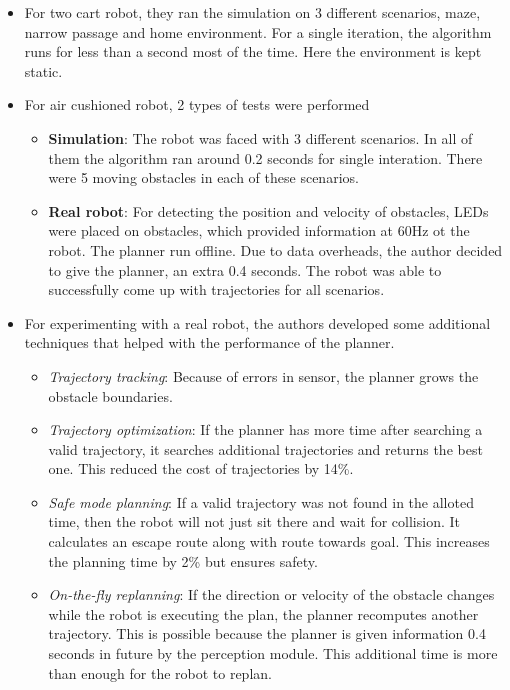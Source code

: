 \documentclass[12pt]{article}
\begin{document}
\begin{itemize}
    \item For two cart robot, they ran the simulation on 3 different scenarios, maze, narrow passage and home environment. For a single iteration, the algorithm runs for less than a second most of the time. Here the environment is kept static.
    \item For air cushioned robot, 2 types of tests were performed
        \begin{itemize}
            \item \textbf{Simulation}: The robot was faced with 3 different scenarios. In all of them the algorithm ran around 0.2 seconds for single interation. There were 5 moving obstacles in each of these scenarios.
            \item \textbf{Real robot}: For detecting the position and velocity of obstacles, LEDs were placed on obstacles, which provided information at 60Hz ot the robot. The planner run offline. Due to data overheads, the author decided to give the planner, an extra 0.4 seconds. The robot was able to successfully come up with trajectories for all scenarios.
        \end{itemize}
    \item For experimenting with a real robot, the authors developed some additional techniques that helped with the performance of the planner.
        \begin{itemize}
            \item \textit{Trajectory tracking}: Because of errors in sensor, the planner grows the obstacle boundaries.
            \item \textit{Trajectory optimization}: If the planner has more time after searching a valid trajectory, it searches additional trajectories and returns the best one. This reduced the cost of trajectories by 14\%.
            \item \textit{Safe mode planning}: If a valid trajectory was not found in the alloted time, then the robot will not just sit there and wait for collision. It calculates an escape route along with route towards goal. This increases the planning time by 2\% but ensures safety.
            \item \textit{On-the-fly replanning}: If the direction or velocity of the obstacle changes while the robot is executing the plan, the planner recomputes another trajectory. This is possible because the planner is given information 0.4 seconds in future by the perception module. This additional time is more than enough for the robot to replan.
        \end{itemize}
\end{itemize}
\end{document}
